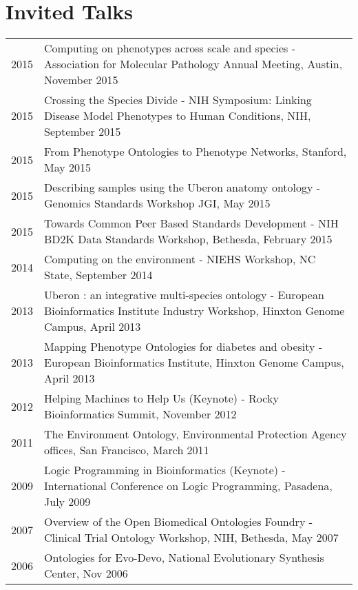 \documentclass[11pt,fullpage]{article}
\begin{document}
\section*{Invited Talks}

\begin{longtable}{p{0.5in}|p{5.5in}}


 2015 & Computing on phenotypes across scale and species - Association for Molecular Pathology Annual Meeting,
  Austin, November 2015\\ 

 2015 & Crossing the Species Divide - NIH Symposium: Linking Disease Model Phenotypes to Human Conditions, 
  NIH, September 2015\\

 2015 & From Phenotype Ontologies to Phenotype Networks, 
  Stanford, May 2015\\

 2015 & Describing samples using the Uberon anatomy ontology - Genomics Standards Workshop
  JGI, May 2015\\

 2015 & Towards Common Peer Based Standards Development  - NIH BD2K Data Standards Workshop, 
  Bethesda, February 2015\\

 2014 & Computing on the environment - NIEHS Workshop, 
 NC State, September 2014\\

 2013 & Uberon : an integrative multi-species ontology - European Bioinformatics Institute Industry Workshop, 
 Hinxton Genome Campus, April 2013\\

 2013 & Mapping Phenotype Ontologies for diabetes and obesity - European Bioinformatics Institute, 
 Hinxton Genome Campus, April 2013\\

 2012 & Helping Machines to Help Us (Keynote) - Rocky Bioinformatics
 Summit, November 2012\\

 2011 & The Environment Ontology, Environmental Protection Agency offices, San Francisco, March 2011 \\

 2009 & Logic Programming in Bioinformatics (Keynote) - International
 Conference on Logic Programming, Pasadena, July 2009 \\

 2007 & Overview of the Open Biomedical Ontologies Foundry - Clinical Trial Ontology Workshop, NIH, Bethesda, May 2007 \\

 2006 & Ontologies for Evo-Devo, National Evolutionary Synthesis Center, Nov 2006 \\


\end{longtable}
\end{document}
